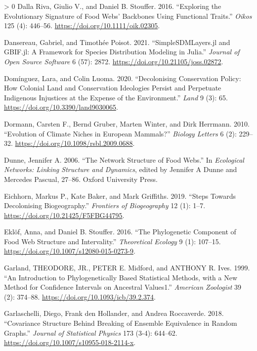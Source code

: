 \documentclass[10pt,oneside]{article}
\newlength{\cslhangindent}
\newenvironment{CSLReferences}[3] %
 {%
  \setlength{\parindent}{0pt}
  \ifodd #1 \everypar{\setlength{\hangindent}{\cslhangindent}}\ignorespaces\fi
  \ifnum #2 > 0
  \setlength{\parskip}{#2\baselineskip}
  \fi
 }%
 {}
\begin{document}
\begin{CSLReferences}{1}{0}
\leavevmode\hypertarget{ref-DallaRiva2016ExpEvo}{}%
Dalla Riva, Giulio V., and Daniel B. Stouffer. 2016. {``Exploring the
Evolutionary Signature of Food Webs' Backbones Using Functional
Traits.''} \emph{Oikos} 125 (4): 446--56.
\url{https://doi.org/10.1111/oik.02305}.

\leavevmode\hypertarget{ref-Dansereau2021SimJl}{}%
Dansereau, Gabriel, and Timothée Poisot. 2021. {``SimpleSDMLayers.jl and
GBIF.jl: A Framework for Species Distribution Modeling in Julia.''}
\emph{Journal of Open Source Software} 6 (57): 2872.
\url{https://doi.org/10.21105/joss.02872}.

\leavevmode\hypertarget{ref-Dominguez2020DecCon}{}%
Domínguez, Lara, and Colin Luoma. 2020. {``Decolonising Conservation
Policy: How Colonial Land and Conservation Ideologies Persist and
Perpetuate Indigenous Injustices at the Expense of the Environment.''}
\emph{Land} 9 (3): 65. \url{https://doi.org/10.3390/land9030065}.

\leavevmode\hypertarget{ref-Dormann2010EvoCli}{}%
Dormann, Carsten F., Bernd Gruber, Marten Winter, and Dirk Herrmann.
2010. {``Evolution of Climate Niches in European Mammals?''}
\emph{Biology Letters} 6 (2): 229--32.
\url{https://doi.org/10.1098/rsbl.2009.0688}.

\leavevmode\hypertarget{ref-Dunne2006NetStr}{}%
Dunne, Jennifer A. 2006. {``The Network Structure of Food Webs.''} In
\emph{Ecological Networks: Linking Structure and Dynamics}, edited by
Jennifer A Dunne and Mercedes Pascual, 27--86. Oxford University Press.

\leavevmode\hypertarget{ref-Eichhorn2019SteDec}{}%
Eichhorn, Markus P., Kate Baker, and Mark Griffiths. 2019. {``Steps
Towards Decolonising Biogeography.''} \emph{Frontiers of Biogeography}
12 (1): 1--7. \url{https://doi.org/10.21425/F5FBG44795}.

\leavevmode\hypertarget{ref-Eklof2016PhyCom}{}%
Eklöf, Anna, and Daniel B. Stouffer. 2016. {``The Phylogenetic Component
of Food Web Structure and Intervality.''} \emph{Theoretical Ecology} 9
(1): 107--15. \url{https://doi.org/10.1007/s12080-015-0273-9}.

\leavevmode\hypertarget{ref-Garland1999IntPhy}{}%
Garland, THEODORE, JR., PETER E. Midford, and ANTHONY R. Ives. 1999.
{``An Introduction to Phylogenetically Based Statistical Methods, with a
New Method for Confidence Intervals on Ancestral Values1.''}
\emph{American Zoologist} 39 (2): 374--88.
\url{https://doi.org/10.1093/icb/39.2.374}.

\leavevmode\hypertarget{ref-Garlaschelli2018CovStr}{}%
Garlaschelli, Diego, Frank den Hollander, and Andrea Roccaverde. 2018.
{``Covariance Structure Behind Breaking of Ensemble Equivalence in
Random Graphs.''} \emph{Journal of Statistical Physics} 173 (3-4):
644--62. \url{https://doi.org/10.1007/s10955-018-2114-x}.


\end{CSLReferences}
\end{document}
